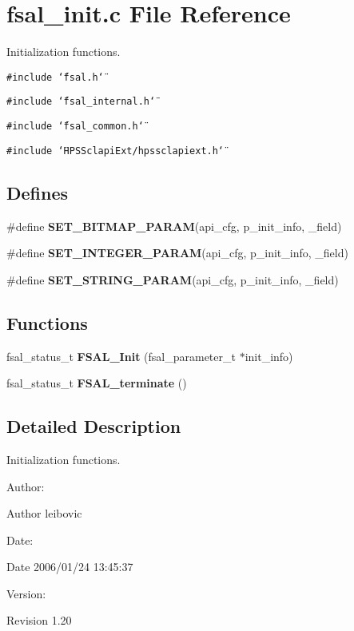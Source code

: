 \section{fsal\_\-init.c File Reference}
\label{fsal__init_8c}
Initialization functions.  


{\tt \#include \char`\"{}fsal.h\char`\"{}}\par
{\tt \#include \char`\"{}fsal\_\-internal.h\char`\"{}}\par
{\tt \#include \char`\"{}fsal\_\-common.h\char`\"{}}\par
{\tt \#include \char`\"{}HPSSclapiExt/hpssclapiext.h\char`\"{}}\par
\subsection*{Defines}
\begin{CompactItemize}
\item 
\#define \textbf{SET\_\-BITMAP\_\-PARAM}(api\_\-cfg, p\_\-init\_\-info, \_\-field)
\item 
\#define \textbf{SET\_\-INTEGER\_\-PARAM}(api\_\-cfg, p\_\-init\_\-info, \_\-field)
\item 
\#define \textbf{SET\_\-STRING\_\-PARAM}(api\_\-cfg, p\_\-init\_\-info, \_\-field)
\end{CompactItemize}
\subsection*{Functions}
\begin{CompactItemize}
\item 
fsal\_\-status\_\-t {\bf FSAL\_\-Init} (fsal\_\-parameter\_\-t $\ast$init\_\-info)
\item 
fsal\_\-status\_\-t \textbf{FSAL\_\-terminate} ()\label{fsal__init_8c_dabe2f2fc596731b07948fb0f9ae51db}

\end{CompactItemize}


\subsection{Detailed Description}
Initialization functions. 

\begin{Desc}
\item[Author:]\end{Desc}
\begin{Desc}
\item[Author]leibovic \end{Desc}
\begin{Desc}
\item[Date:]\end{Desc}
\begin{Desc}
\item[Date]2006/01/24 13:45:37 \end{Desc}
\begin{Desc}
\item[Version:]\end{Desc}
\begin{Desc}
\item[Revision]1.20 \end{Desc}


